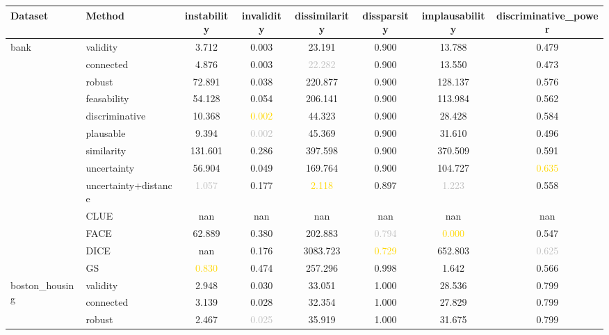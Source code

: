 \begin{table}[ht]
\centering
\begin{tabular}{l l c c c c c c}
\hline
Dataset & Method & instability & invalidity & dissimilarity & dissparsity & implausability & discriminative_power \\
\hline
\multirow{13}{*}{bank} & validity & \textcolor{bronze}{3.712} & 0.003 & \textcolor{bronze}{23.191} & 0.900 & 13.788 & 0.479 \\
 & connected & 4.876 & \textcolor{bronze}{0.003} & \textcolor{silver}{22.282} & 0.900 & 13.550 & 0.473 \\
 & robust & 72.891 & 0.038 & 220.877 & 0.900 & 128.137 & 0.576 \\
 & feasability & 54.128 & 0.054 & 206.141 & 0.900 & 113.984 & 0.562 \\
 & discriminative & 10.368 & \textcolor{gold}{0.002} & 44.323 & 0.900 & 28.428 & 0.584 \\
 & plausable & 9.394 & \textcolor{silver}{0.002} & 45.369 & 0.900 & 31.610 & 0.496 \\
 & similarity & 131.601 & 0.286 & 397.598 & 0.900 & 370.509 & \textcolor{bronze}{0.591} \\
 & uncertainty & 56.904 & 0.049 & 169.764 & 0.900 & 104.727 & \textcolor{gold}{0.635} \\
 & uncertainty+distance & \textcolor{silver}{1.057} & 0.177 & \textcolor{gold}{2.118} & \textcolor{bronze}{0.897} & \textcolor{silver}{1.223} & 0.558 \\
 & CLUE & nan & nan & nan & nan & nan & nan \\
 & FACE & 62.889 & 0.380 & 202.883 & \textcolor{silver}{0.794} & \textcolor{gold}{0.000} & 0.547 \\
 & DICE & nan & 0.176 & 3083.723 & \textcolor{gold}{0.729} & 652.803 & \textcolor{silver}{0.625} \\
 & GS & \textcolor{gold}{0.830} & 0.474 & 257.296 & 0.998 & \textcolor{bronze}{1.642} & 0.566 \\
\hline
\multirow{13}{*}{boston_housing} & validity & 2.948 & 0.030 & 33.051 & \textcolor{bronze}{1.000} & 28.536 & 0.799 \\
 & connected & 3.139 & \textcolor{bronze}{0.028} & 32.354 & \textcolor{bronze}{1.000} & 27.829 & 0.799 \\
 & robust & 2.467 & \textcolor{silver}{0.025} & 35.919 & \textcolor{bronze}{1.000} & 31.675 & 0.799 \\

\end{tabular}
\end{table}
